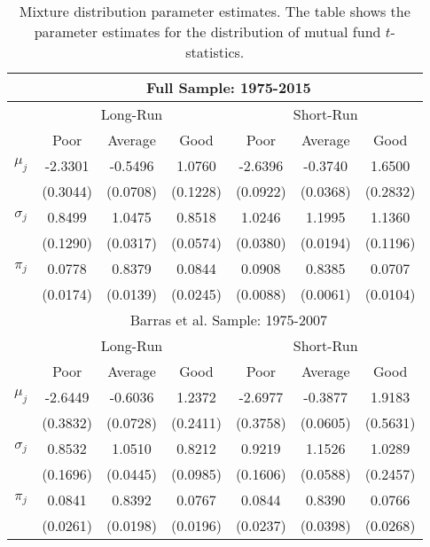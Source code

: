 		\begin{table}[p]
			\small
			\centering
			\begin{tabular}{*{7}{c}}
			\toprule
			& \multicolumn{6}{c}{Full Sample: 1975-2015} \\
			\midrule
			& \multicolumn{3}{c}{Long-Run} & \multicolumn{3}{c}{Short-Run} \\
			\cmidrule(l{2pt}r{2pt}){2-4} \cmidrule(l{2pt}r{2pt}){5-7}
			& Poor & Average & Good & Poor & Average & Good \\
			\midrule
			$\mu_j$ & -2.3301 & -0.5496 & 1.0760 & -2.6396 & -0.3740 & 1.6500 \\
			& (0.3044) & (0.0708) & (0.1228) & (0.0922) & (0.0368) & (0.2832) \\
			$\sigma_j$ & 0.8499 & 1.0475 & 0.8518 & 1.0246 & 1.1995 & 1.1360 \\
			& (0.1290) & (0.0317) & (0.0574) & (0.0380) & (0.0194) & (0.1196) \\
			$\pi_j$ & 0.0778 & 0.8379 & 0.0844 & 0.0908 & 0.8385 & 0.0707 \\
			& (0.0174) & (0.0139) & (0.0245) & (0.0088) & (0.0061) & (0.0104) \\
			\midrule
			& \multicolumn{6}{c}{Barras et al. Sample: 1975-2007} \\
			\midrule
			& \multicolumn{3}{c}{Long-Run} & \multicolumn{3}{c}{Short-Run} \\
			\cmidrule(l{2pt}r{2pt}){2-4} \cmidrule(l{2pt}r{2pt}){5-7}
			& Poor & Average & Good & Poor & Average & Good \\
			\midrule
			$\mu_j$ & -2.6449 & -0.6036 & 1.2372 & -2.6977 & -0.3877 & 1.9183 \\
			& (0.3832) & (0.0728) & (0.2411) & (0.3758) & (0.0605) & (0.5631) \\
			$\sigma_j$ & 0.8532 & 1.0510 & 0.8212 & 0.9219 & 1.1526 & 1.0289 \\
			& (0.1696) & (0.0445) & (0.0985) & (0.1606) & (0.0588) & (0.2457) \\
			$\pi_j$ & 0.0841 & 0.8392 & 0.0767 & 0.0844 & 0.8390 & 0.0766 \\
			& (0.0261) & (0.0198) & (0.0196) & (0.0237) & (0.0398) & (0.0268) \\
			\bottomrule
			\end{tabular}
			\captionsetup{position=below, font=footnotesize, justification=justified, width=0.77\linewidth}
			\caption[Mixture distribution parameter estimates]{Mixture distribution parameter estimates. The table shows the parameter estimates for the distribution of mutual fund $t$-statistics.}
			\label{tab:main}
		\end{table}

